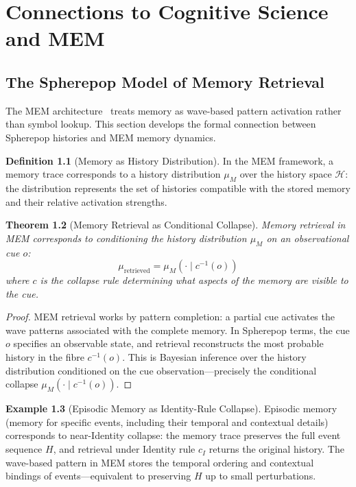 \documentclass[12pt, a4paper, openany]{book}
\theoremstyle{plain}
\newtheorem{theorem}{Theorem}[chapter]
\theoremstyle{definition}
\newtheorem{definition}[theorem]{Definition}
\newtheorem{example}[theorem]{Example}
\theoremstyle{remark}
\newcommand{\calH}{\mathcal{H}}
\begin{document}
\chapter{Connections to Cognitive Science and MEM}

\section{The Spherepop Model of Memory Retrieval}

The MEM architecture~\cite{chenoweth25} treats memory as wave-based
pattern activation rather than symbol lookup. This section develops the formal
connection between Spherepop histories and MEM memory dynamics.

\begin{definition}[Memory as History Distribution]
In the MEM framework, a memory trace corresponds to a history
distribution $\mu_M$ over the history space $\calH$: the distribution represents
the set of histories compatible with the stored memory and their relative
activation strengths.
\end{definition}

\begin{theorem}[Memory Retrieval as Conditional Collapse]
Memory retrieval in MEM corresponds to conditioning the history
distribution $\mu_M$ on an observational cue $o$:
\[
\mu_{\mathrm{retrieved}} = \mu_M(\cdot \mid c^{-1}(o))
\]
where $c$ is the collapse rule determining what aspects of the memory are
visible to the cue.
\end{theorem}

\begin{proof}
MEM retrieval works by pattern completion: a partial cue activates the
wave patterns associated with the complete memory. In Spherepop terms, the cue
$o$ specifies an observable state, and retrieval reconstructs the most probable
history in the fibre $c^{-1}(o)$. This is Bayesian inference over the history
distribution conditioned on the cue observation---precisely the conditional
collapse $\mu_M(\cdot \mid c^{-1}(o))$.
\end{proof}

\begin{example}[Episodic Memory as Identity-Rule Collapse]
Episodic memory (memory for specific events, including their temporal and
contextual details) corresponds to near-Identity collapse: the memory trace
preserves the full event sequence $H$, and retrieval under Identity rule $c_I$
returns the original history. The wave-based pattern in MEM stores
the temporal ordering and contextual bindings of events---equivalent to preserving
$H$ up to small perturbations.
\end{example}
\end{document}
